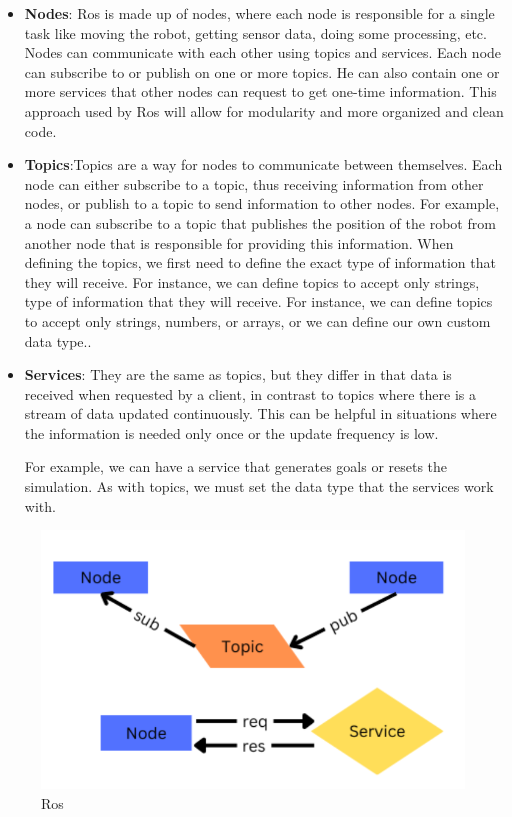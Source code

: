 \documentclass[12pt]{extarticle}
\begin{document}
\begin{itemize}
\item \textbf{Nodes}: Ros is made up of nodes, where each node is responsible for a single task like moving the robot, getting sensor data, doing some processing, etc. Nodes can communicate with each other using topics and services.
Each node can subscribe to or publish on one or more topics. He can also contain one or more services that other nodes can request to get one-time information. This approach used by Ros will allow for modularity and more organized and clean code.



\item \textbf{Topics}:Topics are a way for nodes to communicate between themselves. Each node can either subscribe to a topic, thus receiving information from other nodes, or publish to a topic to send information to other nodes.
For example, a node can subscribe to a topic that publishes the position of the robot from another node that is responsible for providing this information.
When defining the topics, we first need to define the exact type of information that they will receive. For instance, we can define topics to accept only strings,  type of information that they will receive. For instance, we can define topics to accept only strings, numbers, or arrays, or we can define our own custom data type..


\item \textbf{Services}:  They are the same as topics, but they differ in that data is received when requested by a client, in contrast to topics where there is a stream of data updated continuously. This can be helpful in situations where the information is needed only once or the update frequency is low.

For example, we can have a service that generates goals or resets the simulation.
As with topics, we must set the data type that the services work with.

\end{itemize}
 

 
 \begin{figure}[h]  
\centering
\includegraphics[scale=0.4]{ros}
\caption[Ros]{Ros}
\end{figure}
\end{document}
